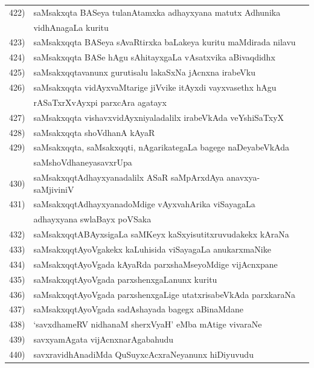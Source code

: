 {\begin{longtable}{@{}cp{7.4cm}r}
422) & saMsakxqta BASeya tulanAtamxka adhayxyana matutx Adhunika & \\
     & vidhAnagaLa kuritu & \pageref{page52}\\
423)  & saMsakxqqta BASeya sAvaRtirxka baLakeya kuritu maMdirada nilavu & \pageref{page33g}\\
424) & saMsakxqqta BASe hAgu sAhitayxgaLa vAsatxvika aBivaqdidhx & \pageref{page31a}\\
425) & saMsakxqqtavanunx gurutisalu lakaSxNa jAcnxna irabeVku & \pageref{page1b}\\ 
426) & saMsakxqqta vidAyxvaMtarige jiVvike itAyxdi vayxvasethx hAgu & \\
     & rASaTxrXvAyxpi parxcAra agatayx & \pageref{page46}\\
427) & saMsakxqqta vishavxvidAyxniyaladalilx irabeVkAda veYshiSaTxyX & \pageref{page37b}\\
428) &  saMsakxqqta shoVdhanA kAyaR & \pageref{page53}\\
429) & saMsakxqqta, saMsakxqqti, nAgarikategaLa bagege naDeyabeVkAda & \\
     & saMshoVdhaneyasavxrUpa & \pageref{page53}\\
430) & saMsakxqqtAdhayxyanadalilx ASaR saMpArxdAya anavxya-saMjiviniV & \pageref{page45a} \\
431) & saMsakxqqtAdhayxyanadoMdige vAyxvahArika viSayagaLa  & \\
     & adhayxyana swlaBayx poVSaka & \pageref{page47}\\
432) & saMsakxqqtABAyxsigaLa saMKeyx kaSxyisutitxruvudakekx kAraNa & \pageref{page45}\\
433) & saMsakxqqtAyoVgakekx kaLuhisida viSayagaLa anukarxmaNike & \pageref{20d}\\
434) & saMsakxqqtAyoVgada kAyaRda parxshaMseyoMdige vijAcnxpane & \pageref{page21}\\
435) & saMsakxqqtAyoVgada parxshenxgaLanunx kuritu & \pageref{page29b}\\ 
436) & saMsakxqqtAyoVgada parxshenxgaLige utatxrisabeVkAda parxkaraNa & \pageref{page19}\\
437) & saMsakxqqtAyoVgada sadAshayada bagegx aBinaMdane & \pageref{page29}\\
438) & `savxdhameRV nidhanaM sherxVyaH' eMba mAtige vivaraNe & \pageref{page197}\\
439) & savxyamAgata vijAcnxnarAgabahudu & \pageref{page107}\\
440) & savxravidhAnadiMda QuSuyxcAcxraNeyanunx hiDiyuvudu & \pageref{page122}\\

\end{longtable}}
